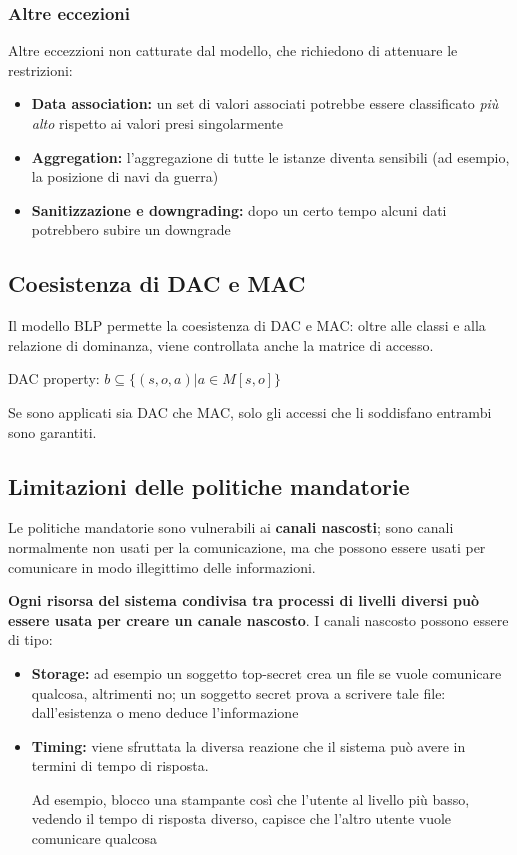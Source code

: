 \documentclass{report}
\begin{document}
\subsubsection{Altre eccezioni}
\noindent Altre eccezzioni non catturate dal modello, che richiedono di attenuare 
le restrizioni:
\begin{itemize}
    \item \textbf{Data association:} un set di valori associati potrebbe essere classificato 
    \textit{più alto} rispetto ai valori presi singolarmente 
    \item \textbf{Aggregation:} l'aggregazione di tutte le istanze diventa sensibili (ad esempio,
    la posizione di navi da guerra)
    \item \textbf{Sanitizzazione e downgrading:} dopo un certo tempo alcuni dati potrebbero 
    subire un downgrade
\end{itemize}


\subsection{Coesistenza di DAC e MAC}
Il modello BLP permette la coesistenza di DAC e MAC: oltre alle classi e 
alla relazione di dominanza, viene controllata anche la matrice di accesso.
\begin{center}
    DAC property: $b \subseteq \{(s,o,a) | a \in M[s,o]\}$
\end{center}

\noindent Se sono applicati sia DAC che MAC, solo gli accessi che li soddisfano entrambi 
sono garantiti.

\subsection{Limitazioni delle politiche mandatorie}
Le politiche mandatorie sono vulnerabili ai \textbf{canali nascosti}; sono 
canali normalmente non usati per la comunicazione, ma che possono essere usati per 
comunicare in modo illegittimo delle informazioni.

\noindent \textbf{Ogni risorsa del sistema condivisa tra processi di livelli diversi 
può essere usata per creare un canale nascosto}. I canali nascosto possono essere di tipo:
\begin{itemize}
    \item \textbf{Storage:} ad esempio un soggetto top-secret crea un file se vuole comunicare 
    qualcosa, altrimenti no; un soggetto secret prova a scrivere tale file: dall'esistenza o meno 
    deduce l'informazione 
    \item \textbf{Timing:} viene sfruttata la diversa reazione che il sistema può avere in 
    termini di tempo di risposta. 
    
    \noindent Ad esempio, blocco una stampante così che l'utente al livello più basso,
    vedendo il tempo di risposta diverso, capisce che l'altro utente vuole comunicare qualcosa
\end{itemize}
\end{document}
